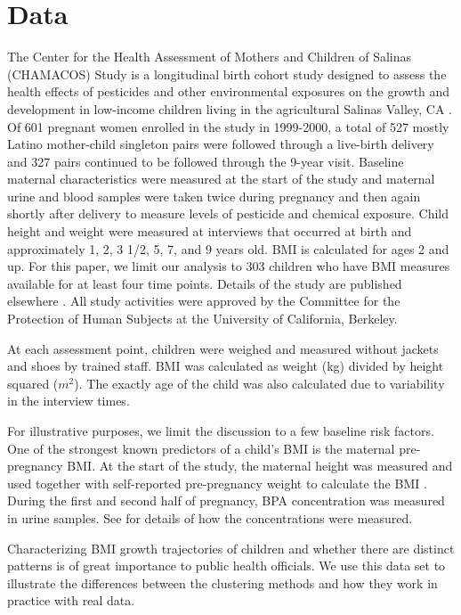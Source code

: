 \section{Data}
The Center for the Health Assessment of Mothers and Children of Salinas (CHAMACOS) Study is a longitudinal birth cohort study designed to assess the health effects of pesticides and other environmental exposures on the growth and development in low-income children living in the agricultural Salinas Valley, CA \cite{eskenazi2004,eskenazi2005}. Of 601 pregnant women enrolled in the study in 1999-2000, a total of 527 mostly Latino mother-child singleton pairs were followed through a live-birth delivery and 327 pairs continued to be followed through the 9-year visit. Baseline maternal characteristics were measured at the start of the study and maternal urine and blood samples were taken twice during pregnancy and then again shortly after delivery to measure levels of pesticide and chemical exposure. Child height and weight  were measured at interviews that occurred at birth and approximately 1, 2, 3 1/2, 5, 7, and 9 years old. BMI is calculated for ages 2 and up. For this paper, we limit our analysis to 303 children who have BMI measures available for at least four time points. Details of the study are published elsewhere \cite{eskenazi2003}. All study activities were approved by the Committee for the Protection of Human Subjects at the University of California, Berkeley. 

At each assessment point, children were weighed and measured without jackets and shoes by trained staff. BMI was calculated as weight (kg) divided by height squared ($m^{2}$). The exactly age of the child was also calculated due to variability in the interview times.

For illustrative purposes, we limit the discussion to a few baseline risk factors. One of the strongest known predictors of a child's BMI is the maternal pre-pregnancy BMI. At the start of the study, the maternal height was measured and used together with self-reported pre-pregnancy weight to calculate the BMI . During the first and second half of pregnancy, BPA concentration was measured in urine samples. See \textcite{harley2013} for details of how the concentrations were measured.

Characterizing BMI growth trajectories of children and whether there are distinct patterns is of great importance to public health officials. We use this data set to illustrate the differences between the clustering methods and how they work in practice with real data.

